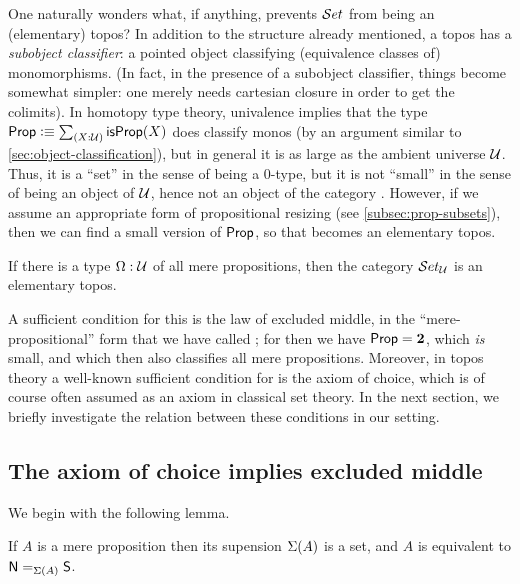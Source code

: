 One naturally wonders what, if anything, prevents $\uset$ from being an (elementary) topos?
In addition to the structure already mentioned, a topos has a
\emph{subobject classifier}: a pointed object classifying (equivalence classes of) monomorphisms.  (In fact, in the presence of a subobject
classifier, things become somewhat simpler: one merely needs cartesian closure in order to get the colimits).
In homotopy type theory, univalence implies that the type $\prop \defeq \sm{X:\UU}\isprop(X)$ does classify monos (by an argument similar to \autoref{sec:object-classification}), but in general it is as large as the ambient universe $\UU$.
Thus, it is a ``set'' in the sense of being a $0$-type, but it is not ``small'' in the sense of being an object of $\UU$, hence not an object of the category \uset.
However, if we assume an appropriate form of propositional resizing (see \autoref{subsec:prop-subsets}), then we can find a small version of $\prop$, so that \uset becomes an elementary topos.

\begin{thm}\label{thm:settopos}
  If there is a type $\Omega:\UU$ of all mere propositions, then the category $\uset_\UU$ is  an elementary topos.
\end{thm}

A sufficient condition for this is the law of excluded middle, in the ``mere-propositional'' form that we have called \LEM{}; for then we have $\prop = \bool$, which \emph{is} small, and which then also classifies all mere propositions.
Moreover, in topos theory a well-known sufficient condition for \LEM{} is the axiom of choice, which is of course often assumed as an axiom in classical set theory.
In the next section, we briefly investigate the relation between these conditions in our setting.


\subsection{The axiom of choice implies excluded middle}
\label{subsec:emacinsets}


We begin with the following lemma.

\begin{lem}\label{prop:trunc_of_prop_is_set}
If $A$ is a mere proposition then its supension $\susp(A)$ is a set,
and $A$ is equivalent to $\id[\susp(A)]{\north}{\south}$.
\end{lem}

